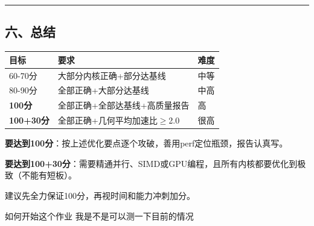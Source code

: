 \documentclass[11pt, a4paper]{article}
\begin{document}
\begin{aibox}
\begin{center}\rule{\textwidth}{0.4pt}\end{center}

\subsection*{六、总结}

\vspace{0.5em}
\begin{tabularx}{\textwidth}{@{} l X l @{}}
\toprule
目标 & 要求 & 难度 \\
\midrule
60-70分 & 大部分内核正确+部分达基线 & 中等 \\
80-90分 & 全部正确+大部分达基线 & 中高 \\
\textbf{100分} & 全部正确+全部达基线+高质量报告 & 高 \\
\textbf{100+30分} & 全部正确+几何平均加速比$\ge$2.0 & 很高 \\
\bottomrule
\end{tabularx}
\vspace{0.5em}

\textbf{要达到100分}：按上述优化要点逐个攻破，善用perf定位瓶颈，报告认真写。

\textbf{要达到100+30分}：需要精通并行、SIMD或GPU编程，且所有内核都要优化到极致（不能有短板）。

建议先全力保证100分，再视时间和能力冲刺加分。
\end{aibox}

\vspace{1.5em}

\begin{userbox}
如何开始这个作业 我是不是可以测一下目前的情况
\end{userbox}
\end{document}
